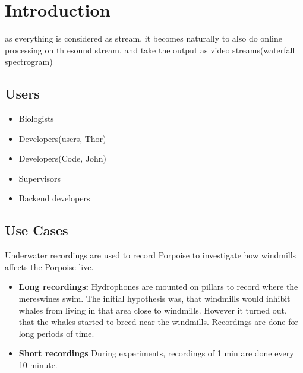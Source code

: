 \chapter{Introduction}

as everything is considered as stream, it becomes naturally to also do online processing on th esound stream, and take the output as video streams(waterfall spectrogram)
\section{Users}

\begin{itemize}
	\item Biologists
	\item Developers(users, Thor)
	\item Developers(Code, John)
	\item Supervisors
	\item Backend developers
\end{itemize}

\section{Use Cases}
Underwater recordings are used to record Porpoise to investigate how windmills affects the Porpoise live.
\begin{itemize}
	\item {\textbf{Long recordings:}}  Hydrophones are mounted on pillars to record where the mereswines swim. The initial hypothesis was, that windmills would inhibit whales from living in that area close to windmills. However it turned out, that the whales started to breed near the windmills. Recordings are done for long periods of time.
	
	\item {\textbf{Short recordings}} During experiments, recordings of 1 min are done every 10 minute.

\end{itemize}


